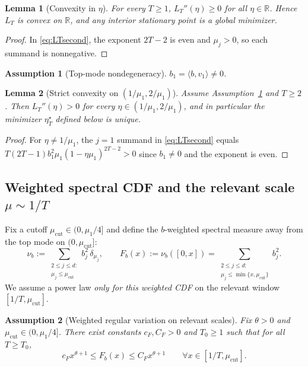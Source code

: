 \documentclass[11pt]{article}
\newtheorem{lemma}{Lemma}
\newtheorem{assumption}{Assumption}
\begin{document}
\begin{lemma}[Convexity in $\eta$]\label{lem:convex}
For every $T\ge 1$, $L_T''(\eta)\ge 0$ for all $\eta\in\mathbb R$. Hence $L_T$ is convex
on $\mathbb R$, and any interior stationary point is a global minimizer.
\end{lemma}

\begin{proof}
In \eqref{eq:LTsecond}, the exponent $2T-2$ is even and $\mu_j>0$, so each summand is
nonnegative.
\end{proof}

\begin{assumption}[Top-mode nondegeneracy]\label{ass:top}
$b_1=\langle b,v_1\rangle\neq 0$.
\end{assumption}

\begin{lemma}[Strict convexity on $(1/\mu_1,2/\mu_1)$]\label{lem:strict-convex}
Assume Assumption~\ref{ass:top} and $T\ge 2$. Then $L_T''(\eta)>0$ for every
$\eta\in(1/\mu_1,2/\mu_1)$, and in particular the minimizer $\eta_T^\star$ defined below
is unique.
\end{lemma}

\begin{proof}
For $\eta\neq 1/\mu_1$, the $j=1$ summand in \eqref{eq:LTsecond} equals
$T(2T-1)b_1^2\mu_1(1-\eta\mu_1)^{2T-2}>0$ since $b_1\neq 0$ and the exponent is even.
\end{proof}

\subsection{Weighted spectral CDF and the relevant scale $\mu\sim 1/T$}

Fix a cutoff $\mu_{\mathrm{cut}}\in(0,\mu_1/4]$ and define the $b$-weighted spectral
measure away from the top mode on $(0,\mu_{\mathrm{cut}}]$:
\[
\nu_b:=\sum_{\substack{2\le j\le d:\\ \mu_j\le \mu_{\mathrm{cut}}}} b_j^2\,\delta_{\mu_j},
\qquad
F_b(x):=\nu_b([0,x])=\sum_{\substack{2\le j\le d:\\ \mu_j\le \min\{x,\mu_{\mathrm{cut}}\}}} b_j^2.
\]
We assume a power law \emph{only for this weighted CDF} on the relevant window
$[1/T,\mu_{\mathrm{cut}}]$.

\begin{assumption}[Weighted regular variation on relevant scales]\label{ass:wRV}
Fix $\theta>0$ and $\mu_{\mathrm{cut}}\in(0,\mu_1/4]$. There exist constants
$c_F,C_F>0$ and $T_0\ge 1$ such that for all $T\ge T_0$,
\begin{equation}\label{eq:wRV}
c_F x^{\theta+1}\le F_b(x)\le C_F x^{\theta+1}
\qquad \forall x\in[1/T,\mu_{\mathrm{cut}}].
\end{equation}
\end{assumption}
\end{document}

